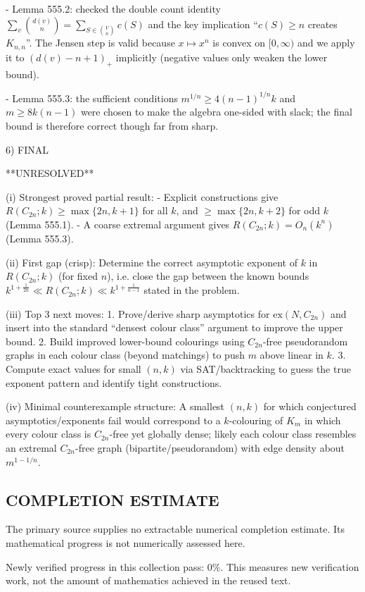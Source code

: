 - Lemma 555.2: checked the double count identity $\sum_v \binom{d(v)}{n}=\sum_{S\in\binom{V}{n}} c(S)$ and the key implication ``$c(S)\ge n$ creates $K_{n,n}$''.
The Jensen step is valid because $x\mapsto x^n$ is convex on $[0,\infty)$ and we apply it to $(d(v)-n+1)_+$ implicitly (negative values only weaken the lower bound).

- Lemma 555.3: the sufficient conditions $m^{1/n}\ge 4(n-1)^{1/n}k$ and $m\ge 8k(n-1)$ were chosen to make the algebra one-sided with slack; the final bound is therefore correct though far from sharp.

6) FINAL

**UNRESOLVED**

(i) Strongest proved partial result:
- Explicit constructions give $R(C_{2n};k)\ge \max\{2n,k+1\}$ for all $k$, and $\ge \max\{2n,k+2\}$ for odd $k$ (Lemma 555.1).
- A coarse extremal argument gives $R(C_{2n};k)=O_n(k^n)$ (Lemma 555.3).

(ii) First gap (crisp):
Determine the correct asymptotic exponent of $k$ in $R(C_{2n};k)$ (for fixed $n$), i.e. close the gap between the known bounds
$k^{1+\frac{1}{2n}}\ll R(C_{2n};k)\ll k^{1+\frac{1}{n-1}}$ stated in the problem.

(iii) Top 3 next moves:
1. Prove/derive sharp asymptotics for $\mathrm{ex}(N,C_{2n})$ and insert into the standard ``densest colour class'' argument to improve the upper bound.
2. Build improved lower-bound colourings using $C_{2n}$-free pseudorandom graphs in each colour class (beyond matchings) to push $m$ above linear in $k$.
3. Compute exact values for small $(n,k)$ via SAT/backtracking to guess the true exponent pattern and identify tight constructions.

(iv) Minimal counterexample structure:
A smallest $(n,k)$ for which conjectured asymptotics/exponents fail would correspond to a $k$-colouring of $K_m$ in which every colour class is $C_{2n}$-free yet globally dense; likely each colour class resembles an extremal $C_{2n}$-free graph (bipartite/pseudorandom) with edge density about $m^{1-1/n}$.



\subsection*{COMPLETION ESTIMATE}
The primary source supplies no extractable numerical completion estimate. Its mathematical progress is not numerically assessed here.

Newly verified progress in this collection pass: $0\%$. This measures new verification work, not the amount of mathematics achieved in the reused text.
